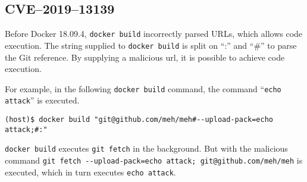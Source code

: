 \subsection{CVE--2019--13139}
Before Docker 18.09.4, \lstinline{docker build} incorrectly parsed URLs, which allows code execution\cite{CVE-2019-13139-STAALDRAAD}. The string supplied to \lstinline{docker build} is split on ``:'' and ``\#'' to parse the Git reference. By supplying a malicious url, it is possible to achieve code execution.

\hfill

For example, in the following \lstinline{docker build} command, the command ``\lstinline{echo attack}'' is executed.

\begin{lstlisting}[caption={\lstinline{docker build} command execution.},captionpos=b]
(host)$ docker build "git@github.com/meh/meh#--upload-pack=echo attack;#:"
\end{lstlisting}

\lstinline{docker build} executes \lstinline{git fetch} in the background. But with the malicious command \lstinline{git fetch --upload-pack=echo attack; git@github.com/meh/meh} is executed, which in turn executes \lstinline{echo attack}.
